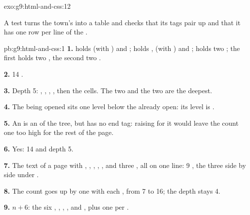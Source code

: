 \begin{solution}{exo:g9:html-and-css:12}
\label{lst:g9:html-and-css:sol-table}

A test turns the town's  into a table and checks that its
tags pair up and that it has one row per line of the .
\end{solution}

\begin{solution}{pb:g9:html-and-css:1}
\textbf{1.}  holds  (with ) and
;  holds ,  (with ) and
;  holds two ; the first holds two
, the second two .

\textbf{2.} 14 .

\textbf{3.} Depth 5: , , , , then
the cells. The two  and the two  are the deepest.

\textbf{4.} The  being opened sits one level below the  already
open: its level is .

\textbf{5.} An  is an  of the tree, but has no end tag:
raising  for it would leave the count one too high for the rest of
the page.

\textbf{6.} Yes: 14  and depth 5.

\label{out:g9:html-and-css:stats}

\textbf{7.} The text of a page with , , ,
, ,  and three , all on one line: 9
, the three  side by side under .

\textbf{8.} The count goes up by one with each , from 7 to 16; the depth
stays 4.

\textbf{9.} $n + 6$: the six  , , ,
,  and , plus one  per .


\end{solution}
